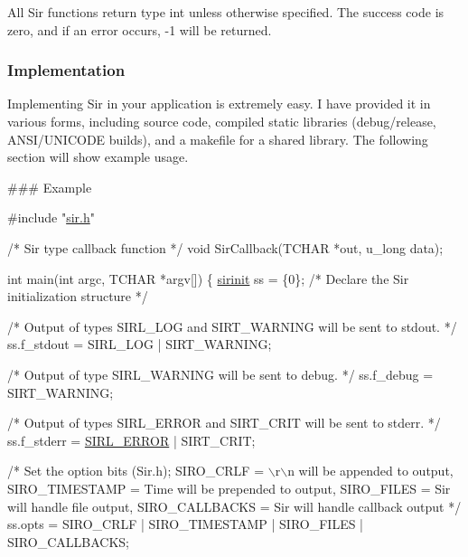 All Sir functions return type int unless otherwise specified. The success code is zero, and if an error occurs, -\/1 will be returned.

\subsubsection*{Implementation}

Implementing Sir in your application is extremely easy. I have provided it in various forms, including source code, compiled static libraries (debug/release, A\+N\+S\+I/\+U\+N\+I\+C\+O\+DE builds), and a makefile for a shared library. The following section will show example usage.

\#\#\# Example 
\begin{DoxyCode}
\textcolor{preprocessor}{#include "\hyperlink{sir_8h}{sir.h}"}

\textcolor{comment}{/*}
\textcolor{comment}{  Sir type callback function}
\textcolor{comment}{*/}
\textcolor{keywordtype}{void} SirCallback(TCHAR *out, u\_long data);

\textcolor{keywordtype}{int} main(\textcolor{keywordtype}{int} argc, TCHAR *argv[]) \{
  \hyperlink{structsirinit}{sirinit} ss = \{0\}; \textcolor{comment}{/* Declare the Sir initialization structure */}

\textcolor{comment}{/*}
\textcolor{comment}{  Output of types SIRL\_LOG and SIRT\_WARNING}
\textcolor{comment}{  will be sent to stdout.}
\textcolor{comment}{ */}
  ss.f\_stdout = SIRL\_LOG | SIRT\_WARNING;

\textcolor{comment}{/*}
\textcolor{comment}{  Output of type SIRL\_WARNING will be sent}
\textcolor{comment}{  to debug.}
\textcolor{comment}{ */}
  ss.f\_debug = SIRT\_WARNING;

\textcolor{comment}{/*}
\textcolor{comment}{  Output of types SIRL\_ERROR and SIRT\_CRIT}
\textcolor{comment}{  will be sent to stderr.}
\textcolor{comment}{ */}
  ss.f\_stderr = \hyperlink{sir_8h_a06fc87d81c62e9abb8790b6e5713c55ba9c687f088db1de838ea5d5f8a8beed76}{SIRL\_ERROR} | SIRT\_CRIT;

\textcolor{comment}{/*}
\textcolor{comment}{  Set the option bits (Sir.h);}
\textcolor{comment}{  SIRO\_CRLF = \(\backslash\)r\(\backslash\)n will be appended to output,}
\textcolor{comment}{  SIRO\_TIMESTAMP = Time will be prepended to output,}
\textcolor{comment}{  SIRO\_FILES = Sir will handle file output,}
\textcolor{comment}{  SIRO\_CALLBACKS = Sir will handle callback output}
\textcolor{comment}{ */}
  ss.opts = SIRO\_CRLF | SIRO\_TIMESTAMP | SIRO\_FILES | SIRO\_CALLBACKS;


\end{DoxyCode}
